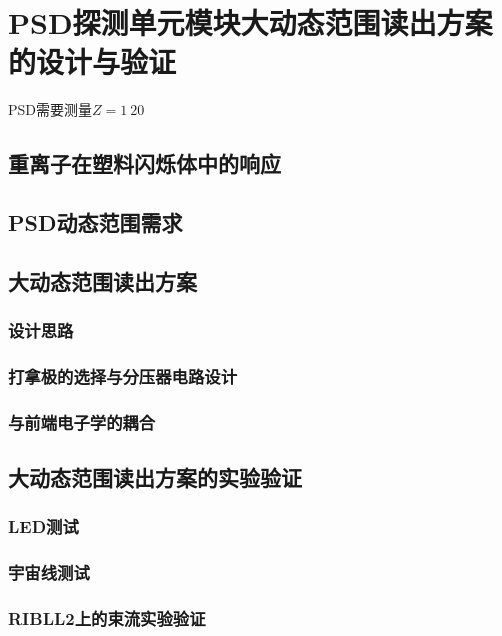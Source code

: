 \chapter{PSD探测单元模块大动态范围读出方案的设计与验证}
\label{ch:large_dynmaicrange}
PSD需要测量$Z=1~20$
\section{重离子在塑料闪烁体中的响应}

\section{PSD动态范围需求}

\section{大动态范围读出方案}
\subsection{设计思路}
\subsection{打拿极的选择与分压器电路设计}
\subsection{与前端电子学的耦合}

\section{大动态范围读出方案的实验验证}
\subsection{LED测试}
\subsection{宇宙线测试}
\subsection{RIBLL2上的束流实验验证}